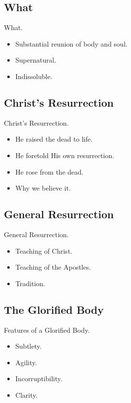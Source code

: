 \documentclass{beamer}
\begin{document}
\subsection{What}

\begin{frame}{What.}
\begin{itemize}
\item Substantial reunion of body and soul.
\item Supernatural.
\item Indissoluble.
\end{itemize}
\end{frame}

\subsection{Christ's Resurrection}

\begin{frame}{Christ's Resurrection.}
\begin{itemize}
\item He raised the dead to life.
\item He foretold His own resurrection.
\item He rose from the dead.
\item Why we believe it.
\end{itemize}
\end{frame}

\subsection{General Resurrection}

\begin{frame}{General Resurrection.}
\begin{itemize}
\item Teaching of Christ.
\item Teaching of the Apostles.
\item Tradition.
\end{itemize}
\end{frame}

\subsection{The Glorified Body}

\begin{frame}{Features of a Glorified Body.}
\begin{itemize}
\item Subtlety.
\item Agility.
\item Incorruptibility.
\item Clarity.
\end{itemize}
\end{frame}
\end{document}
